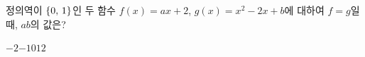 \hspace*{2mm}\begin{minipage}[t]{\dimexpr\linewidth-2mm\relax}\vspace{0pt}
정의역이 $\{0,\mkern3mu 1\}$인 두 함수 $f(x)=ax+2$, $g(x)=x^2-2x+b$에 대하여 $f=g$일 때, $ab$의 값은? 
\begin{choices32}{$-2$}{$-1$}{$0$}{$1$}{$2$}\end{choices32}\end{minipage}
